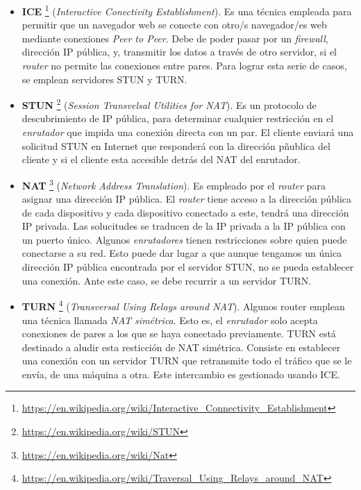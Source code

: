 \documentclass[a4paper, 12pt]{book}
\begin{document}
\begin{itemize}
\item \textbf{ICE} \footnote{\url{https://en.wikipedia.org/wiki/Interactive_Connectivity_Establishment}} (\textit{Interactive Conectivity Establishment}). Es una técnica empleada para permitir que un navegador web se conecte con otro/s navegador/es web mediante conexiones \textit{Peer to Peer}. Debe de poder pasar por un \textit{firewall}, dirección IP pública, y, transmitir los datos a través de otro servidor, si el \textit{router} no permite las conexiones entre pares. Para lograr esta serie de casos, se emplean servidores STUN y TURN.


\item \textbf{STUN} \footnote{\url{https://en.wikipedia.org/wiki/STUN}} (\textit{Session Transvelsal Utilities for NAT}). Es un protocolo de descubrimiento de IP pública, para determinar cualquier restricción en el \textit{enrutador} que impida una conexión directa con un par. El cliente enviará una solicitud STUN en Internet que responderá con la dirección pñublica del cliente y si el cliente esta accesible detrás del NAT del enrutador.

\item \textbf{NAT} \footnote{\url{https://en.wikipedia.org/wiki/Nat}} (\textit{Network Address Translation}). Es empleado por el \textit{router} para asignar una dirección IP pública. El \textit{router} tiene acceso a la dirección pública de cada dispositivo y cada dispositivo conectado a este, tendrá una dirección IP privada. Las solucitudes se traducen de la IP privada a la IP pública con un puerto único. Algunos \textit{enrutadores} tienen restricciones sobre quien puede conectarse a su red. Esto puede dar lugar a que aunque tengamos un única dirección IP pública encontrada por el servidor STUN, no se pueda establecer una conexión. Ante este caso, se debe recurrir a un servidor TURN.

\item \textbf{TURN} \footnote{\url{https://en.wikipedia.org/wiki/Traversal_Using_Relays_around_NAT}} (\textit{Transversal Using Relays around NAT}). Algunos router emplean una técnica llamada \textit{NAT simétrica}. Esto es, el \textit{enrutador} solo acepta conexiones de pares a los que se haya conectado previamente. TURN está destinado a aludir esta resticción de NAT simétrica. Consiste en establecer una conexión con un servidor TURN que retransmite todo el tráfico que se le envía, de una máquina a otra. Este intercambio es gestionado usando ICE.


\end{itemize}
\end{document}
